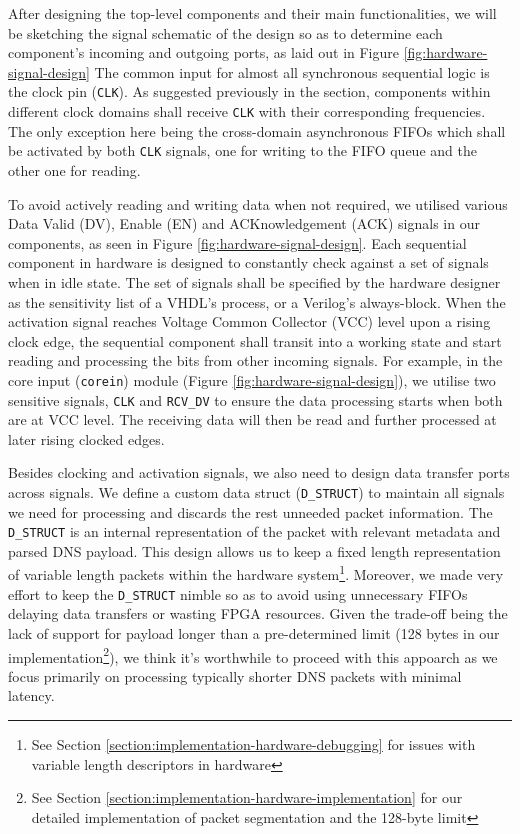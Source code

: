 \documentclass[a4paper]{report}
\newcommand{\proglang}{\textsf}
\newcommand{\code}{\texttt}
\begin{document}
After designing the top-level components and their main functionalities, we will be sketching the signal schematic of the design so as to determine each component's incoming and outgoing ports, as laid out in Figure \ref{fig:hardware-signal-design} The common input for almost all synchronous sequential logic is the clock pin (\code{CLK}). As suggested previously in the section, components within different clock domains shall receive \code{CLK} with their corresponding frequencies. The only exception here being the cross-domain asynchronous FIFOs which shall be activated by both \code{CLK} signals, one for writing to the FIFO queue and the other one for reading.

To avoid actively reading and writing data when not required, we utilised various Data Valid (DV), Enable (EN) and ACKnowledgement (ACK) signals in our components, as seen in Figure \ref{fig:hardware-signal-design}. Each sequential component in hardware is designed to constantly check against a set of signals when in idle state. The set of signals shall be specified by the hardware designer as the sensitivity list of a \proglang{VHDL}'s process, or a \proglang{Verilog}'s always-block. When the activation signal reaches Voltage Common Collector (VCC) level upon a rising clock edge, the sequential component shall transit into a working state and start reading and processing the bits from other incoming signals. For example, in the core input (\code{corein}) module (Figure \ref{fig:hardware-signal-design}), we utilise two sensitive signals, \code{CLK} and \code{RCV\_DV} to ensure the data processing starts when both are at VCC level. The receiving data will then be read and further processed at later rising clocked edges.

Besides clocking and activation signals, we also need to design data transfer ports across signals. We define a custom data struct (\code{D\_STRUCT}) to maintain all signals we need for processing and discards the rest unneeded packet information. The \code{D\_STRUCT} is an internal representation of the packet with relevant metadata and parsed DNS payload. This design allows us to keep a fixed length representation of variable length packets within the hardware system\footnote{See Section \ref{section:implementation-hardware-debugging} for issues with variable length descriptors in hardware}. Moreover, we made very effort to keep the \code{D\_STRUCT} nimble so as to avoid using unnecessary FIFOs delaying data transfers or wasting FPGA resources. Given the trade-off being the lack of support for payload longer than a pre-determined limit (128 bytes in our implementation\footnote{See Section \ref{section:implementation-hardware-implementation} for our detailed implementation of packet segmentation and the 128-byte limit}), we think it's worthwhile to proceed with this appoarch as we focus primarily on processing typically shorter DNS packets with minimal latency.
\end{document}

